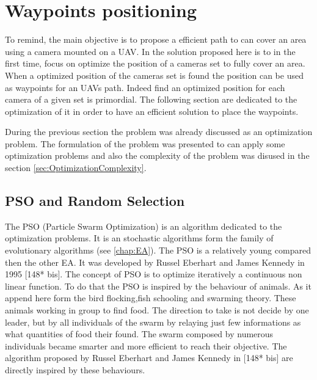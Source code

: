 \chapter{Waypoints positioning} 
\minitoc
To remind, the main objective is to propose a efficient path to can cover an area using a camera mounted on a UAV. In the solution proposed here is to in the first time, focus on optimize the position of a cameras set to fully cover an area. When a optimized position of the cameras set is found the position can be used as waypoints for an UAVs path. Indeed find an optimized position for each camera of a given set is primordial. The following section are dedicated to the optimization of it in order to have an efficient solution to place the waypoints.





During the previous section the problem was already discussed as an optimization problem. The formulation of the problem was presented to can apply some optimization problems and also the complexity of the problem was disused in the section \ref{sec:OptimizationComplexity}.



\section{PSO and Random Selection }

The PSO (Particle Swarm Optimization) is an algorithm dedicated to the optimization problems. It is an stochastic algorithms form the family of evolutionary algorithms (see \ref{chap:EA}). 
The PSO is a relatively young compared then the other EA. It was developed by Russel Eberhart and James Kennedy in 1995 [148* bis]. The concept of PSO is to optimize iteratively a continuous non linear function. To do that the PSO is inspired by the behaviour of animals. As it append here form the bird flocking,fish schooling and swarming theory. These animals working in group to find food. 
The direction to take is not decide by one leader, but by all individuals of the swarm by relaying just few informations as what quantities of food their found. 
The swarm composed by numerous individuals became smarter and more efficient to reach their objective. 
The algorithm proposed by Russel Eberhart and James Kennedy in [148* bis] are directly inspired by these behaviours.

